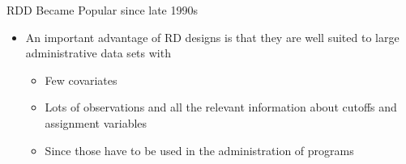 \documentclass[hyperref={pdfpagelabels=false}]{beamer}
\begin{document}
\begin{frame}{RDD Became Popular since late 1990s }{}
	
	\begin{itemize}
		\item An important advantage of RD designs is that they are well suited to
		large administrative data sets with
		\vspace{0.2cm}
		\begin{itemize}
			\item Few covariates
			\vspace{0.2cm}
			\item Lots of observations and all the relevant information about cutoffs and assignment variables 
			\vspace{0.2cm}
			\item Since those have to be used in the administration of programs
		\end{itemize}
		
		
	\end{itemize}
\end{frame}
\end{document}
